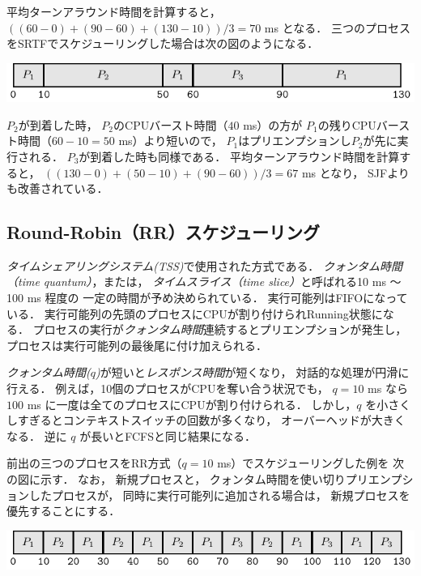 平均ターンアラウンド時間を計算すると，
$((60-0)+(90-60)+(130-10))/3=70$ ms となる．
三つのプロセスをSRTFでスケジューリングした場合は次の図のようになる．

\begin{center}
  \includegraphics[scale=1.0]{GanntChart/srtf1.pdf}
\end{center}

$P_2$が到着した時，
$P_2$のCPUバースト時間（$40$ ms）の方が
$P_1$の残りCPUバースト時間（$60 - 10 = 50$ ms）より短いので，
$P_1$はプリエンプションし$P_2$が先に実行される．
$P_3$が到着した時も同様である．
平均ターンアラウンド時間を計算すると，
$((130-0)+(50-10)+(90-60))/3=67$ ms となり，
SJFよりも改善されている．

\subsection{Round-Robin（RR）スケジューリング}
\emph{タイムシェアリングシステム(TSS)}で使用された方式である．
\emph{クォンタム時間（time quantum）}，または，
\emph{タイムスライス（time slice）}と呼ばれる10 ms 〜 100 ms 程度の
一定の時間が予め決められている．
実行可能列はFIFOになっている．
実行可能列の先頭のプロセスにCPUが割り付けられRunning状態になる．
プロセスの実行が\emph{クォンタム時間}連続するとプリエンプションが発生し，
プロセスは実行可能列の最後尾に付け加えられる．

\emph{クォンタム時間($q$)}が短いと\emph{レスポンス時間}が短くなり，
対話的な処理が円滑に行える．
例えば，10個のプロセスがCPUを奪い合う状況でも，
$q = 10$ ms なら$100$ ms に一度は全てのプロセスにCPUが割り付けられる．
しかし，$q$ を小さくしすぎるとコンテキストスイッチの回数が多くなり，
オーバーヘッドが大きくなる．
逆に $q$ が長いとFCFSと同じ結果になる．

前出の三つのプロセスをRR方式（$q = 10$ ms）でスケジューリングした例を
次の図に示す．
なお，
新規プロセスと，
クォンタム時間を使い切りプリエンプションしたプロセスが，
同時に実行可能列に追加される場合は，
新規プロセスを優先することにする．

\begin{center}
  \includegraphics[scale=1.0]{GanntChart/rr1.pdf}
\end{center}

